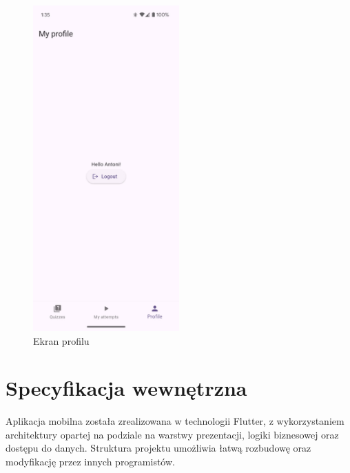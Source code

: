 \documentclass{article}
\begin{document}
\begin{enumerate}
\begin{minipage}{0.5\textwidth}
\begin{figure}[H]
			\centering
			\includegraphics[width=0.5\textwidth]{../_assets/mobile/profile.jpeg}
			\caption{Ekran profilu}
			\label{fig:profile}
		\end{figure}
	\end{minipage}
\end{enumerate}

\section{Specyfikacja wewnętrzna}
	Aplikacja mobilna została zrealizowana w technologii Flutter, z wykorzystaniem architektury opartej na podziale na warstwy prezentacji, logiki biznesowej oraz dostępu do danych. Struktura projektu umożliwia łatwą rozbudowę oraz modyfikację przez innych programistów.
\end{document}
